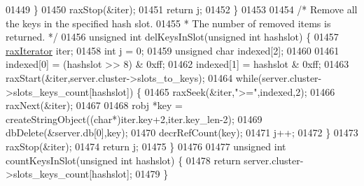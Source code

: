 \begin{DoxyCode}
01449     \}
01450     raxStop(&iter);
01451     \textcolor{keywordflow}{return} j;
01452 \}
01453 
01454 \textcolor{comment}{/* Remove all the keys in the specified hash slot.}
01455 \textcolor{comment}{ * The number of removed items is returned. */}
01456 \textcolor{keywordtype}{unsigned} \textcolor{keywordtype}{int} delKeysInSlot(\textcolor{keywordtype}{unsigned} \textcolor{keywordtype}{int} hashslot) \{
01457     \hyperlink{structraxIterator}{raxIterator} iter;
01458     \textcolor{keywordtype}{int} j = 0;
01459     \textcolor{keywordtype}{unsigned} \textcolor{keywordtype}{char} indexed[2];
01460 
01461     indexed[0] = (hashslot >> 8) & 0xff;
01462     indexed[1] = hashslot & 0xff;
01463     raxStart(&iter,server.cluster->slots\_to\_keys);
01464     \textcolor{keywordflow}{while}(server.cluster->slots\_keys\_count[hashslot]) \{
01465         raxSeek(&iter,\textcolor{stringliteral}{">="},indexed,2);
01466         raxNext(&iter);
01467 
01468         robj *key = createStringObject((\textcolor{keywordtype}{char}*)iter.key+2,iter.key\_len-2);
01469         dbDelete(&server.db[0],key);
01470         decrRefCount(key);
01471         j++;
01472     \}
01473     raxStop(&iter);
01474     \textcolor{keywordflow}{return} j;
01475 \}
01476 
01477 \textcolor{keywordtype}{unsigned} \textcolor{keywordtype}{int} countKeysInSlot(\textcolor{keywordtype}{unsigned} \textcolor{keywordtype}{int} hashslot) \{
01478     \textcolor{keywordflow}{return} server.cluster->slots\_keys\_count[hashslot];
01479 \}
\end{DoxyCode}

